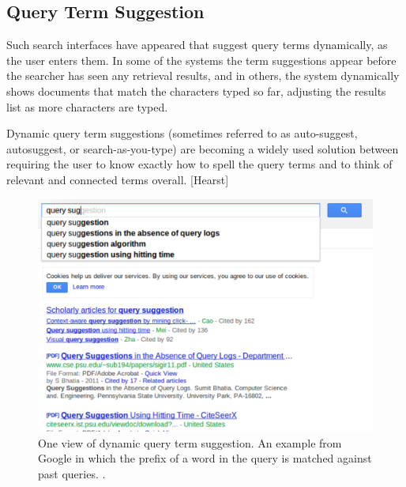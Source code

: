 \documentclass{sigchi}
\begin{document}
\subsection{Query Term Suggestion}

Such search interfaces have appeared that suggest query terms dynamically, as the user enters them. In some of the systems the term suggestions appear before the searcher has seen any retrieval results, and in others, the system dynamically shows documents that match the characters typed so far, adjusting the results list as more characters are typed. 

Dynamic query term suggestions (sometimes referred to as auto-suggest, autosuggest, or search-as-you-type) are becoming a widely used solution between requiring the user to know exactly how to spell the query terms and to think of relevant and connected terms overall. [Hearst]

\begin{figure}[htp] %
\caption{One view of dynamic query term suggestion. An example from Google in which the prefix of a word in the query is matched against past queries. \protect.} \label{figure_querysuggestion2}
\includegraphics[scale=0.41]{figures/dynamicQueryTermSuggestion2.pdf} 
\end{figure}
\end{document}
